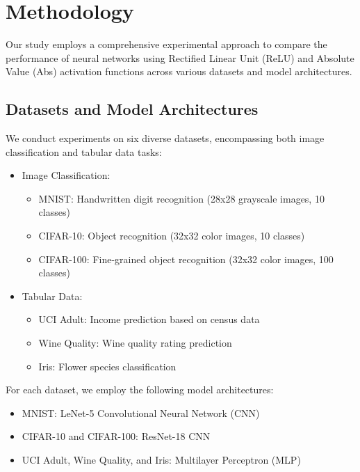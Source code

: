 \documentclass[11pt]{article}
\begin{document}
\section{Methodology}

Our study employs a comprehensive experimental approach to compare the performance of neural networks using Rectified Linear Unit (ReLU) and Absolute Value (Abs) activation functions across various datasets and model architectures.

\subsection{Datasets and Model Architectures}
We conduct experiments on six diverse datasets, encompassing both image classification and tabular data tasks:

\begin{itemize}
\item Image Classification:

\begin{itemize}
\item MNIST: Handwritten digit recognition (28x28 grayscale images, 10 classes)
\item CIFAR-10: Object recognition (32x32 color images, 10 classes)
\item CIFAR-100: Fine-grained object recognition (32x32 color images, 100 classes)
\end{itemize}

\item Tabular Data:

\begin{itemize}
\item UCI Adult: Income prediction based on census data
\item Wine Quality: Wine quality rating prediction
\item Iris: Flower species classification
\end{itemize}

\end{itemize}

For each dataset, we employ the following model architectures:

\begin{itemize}
\item MNIST: LeNet-5 Convolutional Neural Network (CNN)
\item CIFAR-10 and CIFAR-100: ResNet-18 CNN
\item UCI Adult, Wine Quality, and Iris: Multilayer Perceptron (MLP)
\end{itemize}
\end{document}
